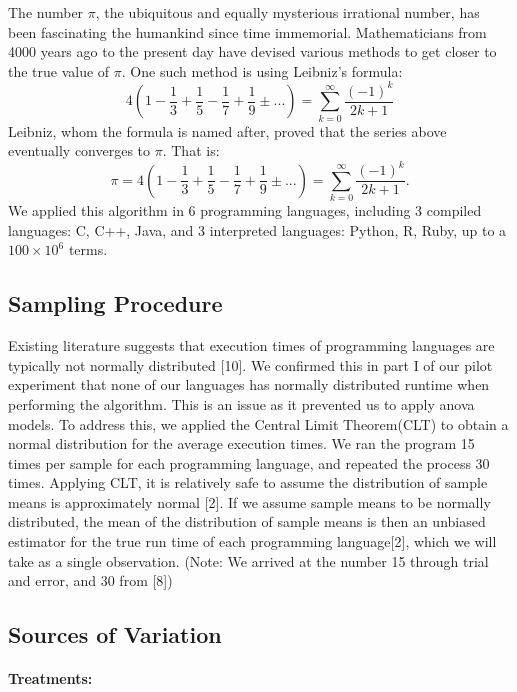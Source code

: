 \documentclass[12pt,halfline,a4paper,]{ouparticle}
\begin{document}
The number \(\pi\), the ubiquitous and equally mysterious irrational
number, has been fascinating the humankind since time immemorial.
Mathematicians from 4000 years ago to the present day have devised
various methods to get closer to the true value of \(\pi\). One such
method is using Leibniz's formula: \[
4 \left( 1 - \frac{1}{3} + \frac{1}{5} - \frac{1}{7} + \frac{1}{9} ±... \right) = \sum_{k=0}^{\infty}\frac{(-1)^k}{2k+1}
\] Leibniz, whom the formula is named after, proved that the series
above eventually converges to \(\pi\). That is: \[
\pi = 4 \left( 1 - \frac{1}{3} + \frac{1}{5} - \frac{1}{7} + \frac{1}{9} ±... \right) = \sum_{k=0}^{\infty}\frac{(-1)^k}{2k+1}.
\] We applied this algorithm in 6 programming languages, including 3
compiled languages: C, C++, Java, and 3 interpreted languages: Python,
R, Ruby, up to a \(100 \times 10^6\) terms.

\hypertarget{sampling-procedure}{%
\subsection{Sampling Procedure}\label{sampling-procedure}}

Existing literature suggests that execution times of programming
languages are typically not normally distributed {[}10{]}. We confirmed
this in part I of our pilot experiment that none of our languages has
normally distributed runtime when performing the algorithm. This is an
issue as it prevented us to apply anova models. To address this, we
applied the Central Limit Theorem(CLT) to obtain a normal distribution
for the average execution times. We ran the program 15 times per sample
for each programming language, and repeated the process 30 times.
Applying CLT, it is relatively safe to assume the distribution of sample
means is approximately normal {[}2{]}. If we assume sample means to be
normally distributed, the mean of the distribution of sample means is
then an unbiased estimator for the true run time of each programming
language{[}2{]}, which we will take as a single observation. (Note: We
arrived at the number 15 through trial and error, and 30 from {[}8{]})

\hypertarget{sources-of-variation}{%
\subsection{Sources of Variation}\label{sources-of-variation}}

\hypertarget{treatments}{%
\paragraph{Treatments:}\label{treatments}}
\end{document}
